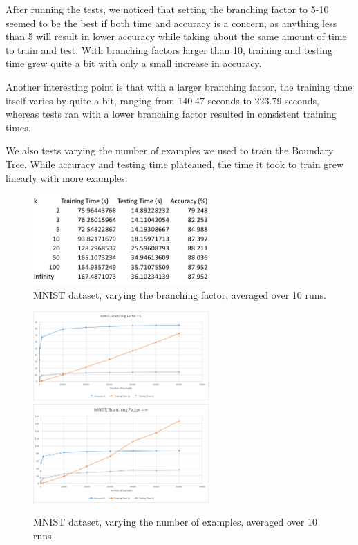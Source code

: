 \documentclass[10pt,letterpaper]{article}
\begin{document}
		After running the tests, we noticed that setting the branching factor to 5-10 seemed to be the best if both time and accuracy is a concern, as anything less than 5 will result in lower accuracy while taking about the same amount of time to train and test. With branching factors larger than 10, training and testing time grew quite a bit with only a small increase in accuracy.
		
		Another interesting point is that with a larger branching factor, the training time itself varies by quite a bit, ranging from 140.47 seconds to 223.79 seconds, whereas tests ran with a lower branching factor resulted in consistent training times.
		
		We also tests varying the number of examples we used to train the Boundary Tree. While accuracy and testing time plateaued, the time it took to train grew linearly with more examples.
		
		\begin{figure}[H]
			\caption{MNIST dataset, varying the branching factor, averaged over 10 runs.}
			\centering
			\includegraphics[width=0.60\textwidth]{mnist-varying-k.png}
		\end{figure}
	
	\begin{figure}[H]
		\caption{MNIST dataset, varying the number of examples, averaged over 10 runs.}
		\centering
		\includegraphics[width=0.60\textwidth]{mnistk5.png}
		\includegraphics[width=0.60\textwidth]{mnistkinfinity.png}
	\end{figure}
		
\end{document}
